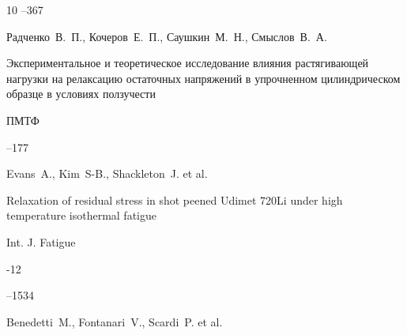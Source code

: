 \begin{thebibliography}{10}
--367






\by Радченко~В.~П., Кочеров~Е.~П., Саушкин~М.~Н., Смыслов~В.~А.

\paper Экспериментальное и теоретическое исследование влияния растягивающей нагрузки на релаксацию остаточных напряжений в упрочненном цилиндрическом образце в условиях ползучести

\jour ПМТФ




--177















\by Evans~A., Kim~S-B., Shackleton~J. et al.

\paper Relaxation of residual stress in shot peened Udimet 720Li under high temperature isothermal fatigue

\jour Int. J. Fatigue



-12

--1534






\by Benedetti~M., Fontanari~V., Scardi~P. et al.


\end{thebibliography}
